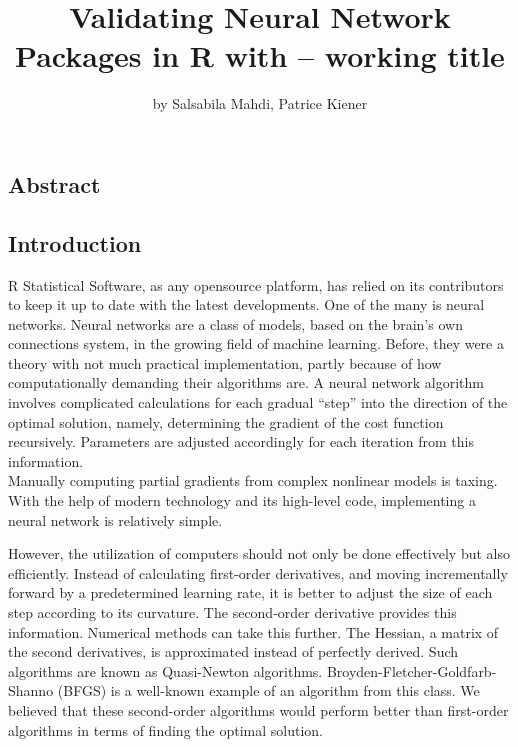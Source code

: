 \title{Validating Neural Network Packages in R with  --
working title}
\author{by Salsabila Mahdi, Patrice Kiener}

\maketitle


\hypertarget{abstract}{%
\subsection{Abstract}\label{abstract}}

\hypertarget{introduction}{%
\subsection{Introduction}\label{introduction}}

R Statistical Software, as any opensource platform, has relied on its
contributors to keep it up to date with the latest developments. One of
the many is neural networks. Neural networks are a class of models,
based on the brain's own connections system, in the growing field of
machine learning. Before, they were a theory with not much practical
implementation, partly because of how computationally demanding their
algorithms are. A neural network algorithm involves complicated
calculations for each gradual ``step'' into the direction of the optimal
solution, namely, determining the gradient of the cost function
recursively. Parameters are adjusted accordingly for each iteration from
this information.\\
Manually computing partial gradients from complex nonlinear models is
taxing. With the help of modern technology and its high-level code,
implementing a neural network is relatively simple.

However, the utilization of computers should not only be done
effectively but also efficiently. Instead of calculating first-order
derivatives, and moving incrementally forward by a predetermined
learning rate, it is better to adjust the size of each step according to
its curvature. The second-order derivative provides this information.
Numerical methods can take this further. The Hessian, a matrix of the
second derivatives, is approximated instead of perfectly derived. Such
algorithms are known as Quasi-Newton algorithms.
Broyden-Fletcher-Goldfarb-Shanno (BFGS) is a well-known example of an
algorithm from this class. We believed that these second-order
algorithms would perform better than first-order algorithms in terms of
finding the optimal solution.

